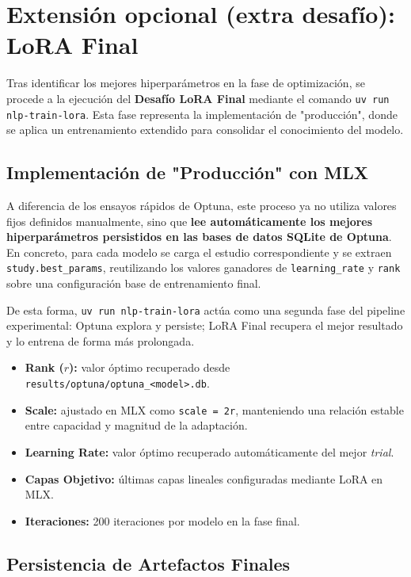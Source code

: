 \section{Extensión opcional (extra desafío): LoRA Final}

Tras identificar los mejores hiperparámetros en la fase de optimización, se procede a la ejecución del \textbf{Desafío LoRA Final} mediante el comando \texttt{uv run nlp-train-lora}. Esta fase representa la implementación de "producción", donde se aplica un entrenamiento extendido para consolidar el conocimiento del modelo.

\subsection{Implementación de "Producción" con MLX}

A diferencia de los ensayos rápidos de Optuna, este proceso ya no utiliza valores fijos definidos manualmente, sino que \textbf{lee automáticamente los mejores hiperparámetros persistidos en las bases de datos SQLite de Optuna}. En concreto, para cada modelo se carga el estudio correspondiente y se extraen \texttt{study.best\_params}, reutilizando los valores ganadores de \texttt{learning\_rate} y \texttt{rank} sobre una configuración base de entrenamiento final.

De esta forma, \texttt{uv run nlp-train-lora} actúa como una segunda fase del pipeline experimental: Optuna explora y persiste; LoRA Final recupera el mejor resultado y lo entrena de forma más prolongada.

\begin{itemize}
    \item \textbf{Rank ($r$):} valor óptimo recuperado desde \texttt{results/optuna/optuna\_<model>.db}.
    \item \textbf{Scale:} ajustado en MLX como \texttt{scale = 2r}, manteniendo una relación estable entre capacidad y magnitud de la adaptación.
    \item \textbf{Learning Rate:} valor óptimo recuperado automáticamente del mejor \textit{trial}.
    \item \textbf{Capas Objetivo:} últimas capas lineales configuradas mediante LoRA en MLX.
    \item \textbf{Iteraciones:} 200 iteraciones por modelo en la fase final.
\end{itemize}

\subsection{Persistencia de Artefactos Finales}

